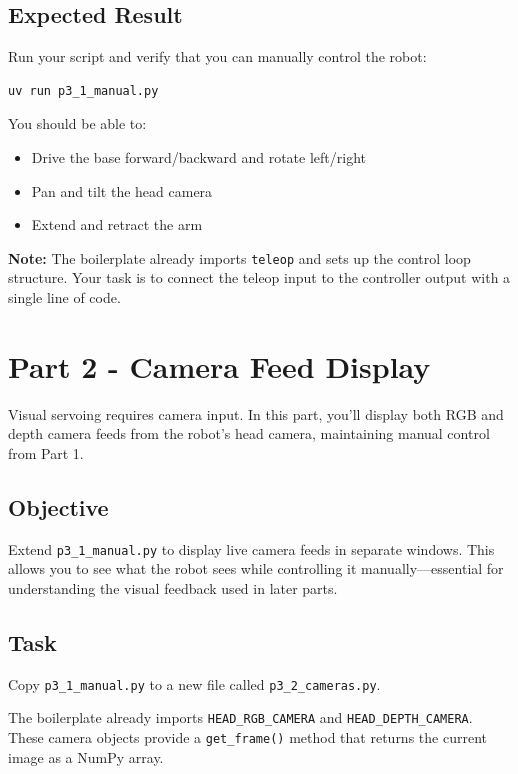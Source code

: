 \documentclass[11pt,a4paper]{article}
\begin{document}
\subsection*{Expected Result}

Run your script and verify that you can manually control the robot:

\begin{lstlisting}[language=bash]
uv run p3_1_manual.py
\end{lstlisting}

You should be able to:
\begin{itemize}
    \item Drive the base forward/backward and rotate left/right
    \item Pan and tilt the head camera
    \item Extend and retract the arm
\end{itemize}

\textbf{Note:} The boilerplate already imports \texttt{teleop} and sets up the control loop structure. Your task is to connect the teleop input to the controller output with a single line of code.

\newpage

\section*{Part 2 - Camera Feed Display}

Visual servoing requires camera input. In this part, you'll display both RGB and depth camera feeds from the robot's head camera, maintaining manual control from Part 1.

\subsection*{Objective}

Extend \texttt{p3\_1\_manual.py} to display live camera feeds in separate windows. This allows you to see what the robot sees while controlling it manually—essential for understanding the visual feedback used in later parts.

\subsection*{Task}

Copy \texttt{p3\_1\_manual.py} to a new file called \texttt{p3\_2\_cameras.py}.

The boilerplate already imports \texttt{HEAD\_RGB\_CAMERA} and \texttt{HEAD\_DEPTH\_CAMERA}. These camera objects provide a \texttt{get\_frame()} method that returns the current image as a NumPy array.
\end{document}
